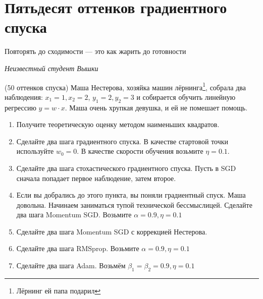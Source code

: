 
\section{Пятьдесят оттенков градиентного спуска}

\epigraph{Повторять до сходимости --- это как жарить до готовности}{\textit{Неизвестный студент Вышки}}


\begin{problem}{(50 оттенков спуска)}
	Маша Нестерова, хозяйка машин лёрнинга\footnote{Лёрнинг ей папа подарил},  собрала два наблюдения: $x_1 = 1, x_2 = 2$, $y_1 = 2, y_2 = 3$ и собирается обучить линейную регрессию $y = w \cdot x$.  Маша очень хрупкая девушка, и ей не помешает помощь. 

	\begin{enumerate}
		\item Получите теоретическую оценку методом наименьших квадратов.
		
		\item  Сделайте два шага градиентного спуска. В качестве стартовой точки используйте $w_0 = 0$.  В качестве скорости обучения возьмите $\eta = 0.1$. 
		
		\item Сделайте два шага стохастического градиентного спуска.  Пусть в SGD сначала попадает первое наблюдение, затем второе. 
		
		\item Если вы добрались до этого пункта, вы поняли градиентный спуск. Маша довольна. Начинаем заниматься тупой технической бессмыслицей. Сделайте два шага Momentum SGD. Возьмите $\alpha = 0.9, \eta = 0.1$
		
		\item  Сделайте два шага Momentum SGD с коррекцией Нестерова. 
		
		\item Сделайте два шага RMSprop.  Возьмите $\alpha = 0.9, \eta = 0.1$
		
		\item  Сделайте два шага Adam. Возьмём  $\beta_1 = \beta_2 = 0.9, \eta = 0.1$		
	\end{enumerate}
\end{problem}



